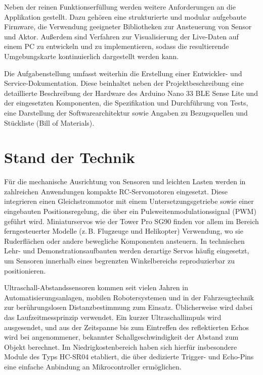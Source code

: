 	Neben der reinen Funktionserfüllung werden weitere Anforderungen an die
	Applikation gestellt. Dazu gehören eine strukturierte und modular aufgebaute Firmware, die Verwendung geeigneter Bibliotheken zur Ansteuerung von Sensor und Aktor. Au\ss erdem sind Verfahren zur Visualisierung der Live-Daten auf einem PC zu entwickeln und zu implementieren, sodass die resultierende Umgebungskarte kontinuierlich dargestellt werden kann.
	
	Die Aufgabenstellung umfasst weiterhin die Erstellung einer Entwickler- und Service-Dokumentation. Diese beinhaltet neben der Projektbeschreibung eine detaillierte Beschreibung der Hardware des Arduino Nano 33 BLE Sense Lite und der eingesetzten Komponenten, die Spezifikation und Durchführung von Tests, eine Darstellung der Softwarearchitektur sowie Angaben zu Bezugsquellen und Stückliste (Bill of Materials).
	

\chapter{Stand der Technik}

	Für die mechanische Ausrichtung von Sensoren und leichten Lasten werden in zahlreichen Anwendungen kompakte RC‑Servomotoren eingesetzt. Diese integrieren einen Gleichstrommotor mit einem Untersetzungsgetriebe sowie einer eingebauten Positionsregelung, die über ein Pulsweitenmodulationssignal (PWM) geführt wird. Miniaturservos wie der Tower Pro SG90 finden vor allem im Bereich ferngesteuerter Modelle (z.\,B. Flugzeuge und Helikopter) Verwendung, wo sie Ruderflächen oder andere bewegliche Komponenten ansteuern.\cite{kts:2026} In technischen Lehr- und Demonstrationsaufbauten werden derartige Servos häufig eingesetzt, um Sensoren innerhalb eines begrenzten Winkelbereichs reproduzierbar zu positionieren.
	
	Ultraschall-Abstandssensoren kommen seit vielen Jahren in Automatisierungsanlagen, mobilen Robotersystemen und in der Fahrzeugtechnik zur berührungslosen Distanzbestimmung zum Einsatz. Üblicherweise wird dabei das Laufzeitmessprinzip verwendet. Ein kurzer Ultraschallimpuls wird ausgesendet, und aus der Zeitspanne bis zum Eintreffen des reflektierten Echos wird bei angenommener, bekannter Schallgeschwindigkeit der Abstand zum Objekt berechnet. Im Niedrigkostenbereich haben sich hierfür insbesondere Module des Typs HC-SR04 etabliert, die über dedizierte Trigger- und Echo-Pins eine einfache Anbindung an Mikrocontroller ermöglichen.
	
